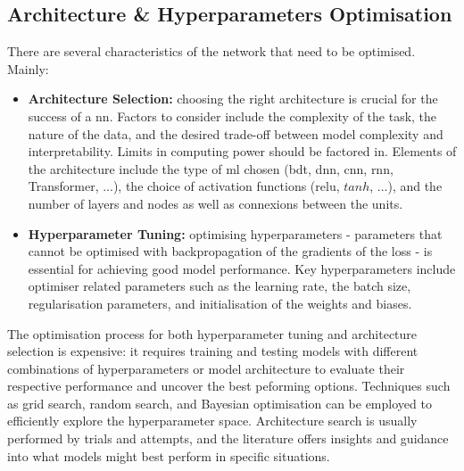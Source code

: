 \subsection{Architecture \& Hyperparameters Optimisation}
There are several characteristics of the network that need to be optimised. Mainly: 
\begin{itemize}
    \item \textbf{Architecture Selection:} choosing the right architecture is crucial for the success of a \gls{nn}. Factors to consider include the complexity of the task, the nature of the data, and the desired trade-off between model complexity and interpretability. Limits in computing power should be factored in. Elements of the architecture include the type of \gls{ml} chosen (\gls{bdt}, \gls{dnn}, \gls{cnn}, \gls{rnn}, Transformer, ...), the choice of activation functions (\gls{relu}, $tanh$, ...), and the number of layers and nodes as well as connexions between the units.
    \item \textbf{Hyperparameter Tuning:} optimising hyperparameters - parameters that cannot be optimised with backpropagation of the gradients of the loss - is essential for achieving good model performance. Key hyperparameters include optimiser related parameters such as the learning rate, the batch size, regularisation parameters, and initialisation of the weights and biases.
\end{itemize}
The optimisation process for both hyperparameter tuning and architecture selection is expensive: it requires training and testing models with different combinations of hyperparameters or model architecture to evaluate their respective performance and uncover the best peforming options. Techniques such as grid search, random search, and Bayesian optimisation can be employed to efficiently explore the hyperparameter space. Architecture search is usually performed by trials and attempts, and the literature offers insights and guidance into what models might best perform in specific situations. 


